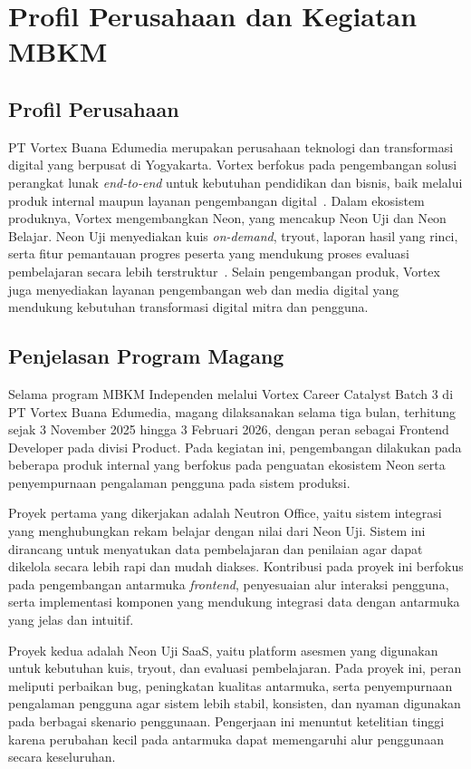 \chapter{Profil Perusahaan dan Kegiatan MBKM}

\section{Profil Perusahaan}
PT Vortex Buana Edumedia merupakan perusahaan teknologi dan transformasi digital yang berpusat di Yogyakarta. Vortex berfokus pada pengembangan solusi perangkat lunak \textit{end-to-end} untuk kebutuhan pendidikan dan bisnis, baik melalui produk internal maupun layanan pengembangan digital~\cite{vortex_software}. Dalam ekosistem produknya, Vortex mengembangkan Neon, yang mencakup Neon Uji dan Neon Belajar. Neon Uji menyediakan kuis \textit{on-demand}, tryout, laporan hasil yang rinci, serta fitur pemantauan progres peserta yang mendukung proses evaluasi pembelajaran secara lebih terstruktur~\cite{vortex_neon_uji}. Selain pengembangan produk, Vortex juga menyediakan layanan pengembangan web dan media digital yang mendukung kebutuhan transformasi digital mitra dan pengguna.

\section{Penjelasan Program Magang}
Selama program MBKM Independen melalui Vortex Career Catalyst Batch 3 di PT Vortex Buana Edumedia, magang dilaksanakan selama tiga bulan, terhitung sejak 3 November 2025 hingga 3 Februari 2026, dengan peran sebagai Frontend Developer pada divisi Product. Pada kegiatan ini, pengembangan dilakukan pada beberapa produk internal yang berfokus pada penguatan ekosistem Neon serta penyempurnaan pengalaman pengguna pada sistem produksi.

Proyek pertama yang dikerjakan adalah Neutron Office, yaitu sistem integrasi yang menghubungkan rekam belajar dengan nilai dari Neon Uji. Sistem ini dirancang untuk menyatukan data pembelajaran dan penilaian agar dapat dikelola secara lebih rapi dan mudah diakses. Kontribusi pada proyek ini berfokus pada pengembangan antarmuka \textit{frontend}, penyesuaian alur interaksi pengguna, serta implementasi komponen yang mendukung integrasi data dengan antarmuka yang jelas dan intuitif.

Proyek kedua adalah Neon Uji SaaS, yaitu platform asesmen yang digunakan untuk kebutuhan kuis, tryout, dan evaluasi pembelajaran. Pada proyek ini, peran meliputi perbaikan bug, peningkatan kualitas antarmuka, serta penyempurnaan pengalaman pengguna agar sistem lebih stabil, konsisten, dan nyaman digunakan pada berbagai skenario penggunaan. Pengerjaan ini menuntut ketelitian tinggi karena perubahan kecil pada antarmuka dapat memengaruhi alur penggunaan secara keseluruhan.

